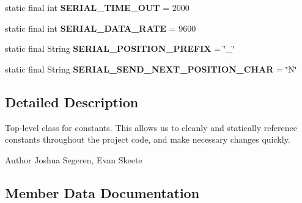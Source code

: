 \begin{DoxyCompactItemize}
\item 
\hypertarget{classairhockeyjava_1_1game_1_1_constants_ab32615c910285dbbb1d776fce31f6711}{}static final int {\bfseries S\+E\+R\+I\+A\+L\+\_\+\+T\+I\+M\+E\+\_\+\+O\+U\+T} = 2000\label{classairhockeyjava_1_1game_1_1_constants_ab32615c910285dbbb1d776fce31f6711}

\item 
\hypertarget{classairhockeyjava_1_1game_1_1_constants_a403fef81d2bf2cdaffd1918939bc2220}{}static final int {\bfseries S\+E\+R\+I\+A\+L\+\_\+\+D\+A\+T\+A\+\_\+\+R\+A\+T\+E} = 9600\label{classairhockeyjava_1_1game_1_1_constants_a403fef81d2bf2cdaffd1918939bc2220}

\item 
\hypertarget{classairhockeyjava_1_1game_1_1_constants_ad65d2536ce08587030f26e536a422d54}{}static final String {\bfseries S\+E\+R\+I\+A\+L\+\_\+\+P\+O\+S\+I\+T\+I\+O\+N\+\_\+\+P\+R\+E\+F\+I\+X} = \char`\"{}\+\_\+\char`\"{}\label{classairhockeyjava_1_1game_1_1_constants_ad65d2536ce08587030f26e536a422d54}

\item 
\hypertarget{classairhockeyjava_1_1game_1_1_constants_a0906604d0aa0245af7b3a7d2595b9e31}{}static final String {\bfseries S\+E\+R\+I\+A\+L\+\_\+\+S\+E\+N\+D\+\_\+\+N\+E\+X\+T\+\_\+\+P\+O\+S\+I\+T\+I\+O\+N\+\_\+\+C\+H\+A\+R} = \char`\"{}N\char`\"{}\label{classairhockeyjava_1_1game_1_1_constants_a0906604d0aa0245af7b3a7d2595b9e31}

\end{DoxyCompactItemize}


\subsection{Detailed Description}
Top-\/level class for constants. This allows us to cleanly and statically reference constants throughout the project code, and make necessary changes quickly.

\begin{DoxyAuthor}{Author}
Joshua Segeren, Evan Skeete 
\end{DoxyAuthor}


\subsection{Member Data Documentation}
\hypertarget{classairhockeyjava_1_1game_1_1_constants_a8a848f6d39f4b63e53885ba0f79d0673}{}
